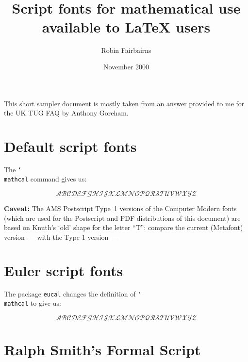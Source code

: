 \documentclass[a4paper]{article}
\DeclareRobustCommand\cs[1]{\texttt{\char`\\#1}}
\begin{document}
\title{Script fonts for mathematical use\\ available to \LaTeX{} users}
\author{Robin Fairbairns}
\date{November 2000}
\maketitle

This short sampler document is mostly taken from an answer provided to
me for the UK TUG FAQ by Anthony Goreham.

\section{Default script fonts}

The \cs{mathcal} command gives us:

$$\mathcal{ABCDEFGHIJKLMNOPQRSTUVWXYZ}$$

\newlength\depthT
\settoheight{}

\noindent\textbf{Caveat:} The AMS Postscript Type~1 versions of the Computer
Modern fonts (which are used for the Postscript and PDF distributions
of this document) are based on Knuth's `old' shape for the letter
``T'': compare the current (Meta\-font) version~---
 with the Type
1 version~--- 

\section{Euler script fonts}

The package \texttt{eucal} changes the definition of \cs{mathcal} to
give us:

\renewcommand\DeclareMathAlphabet[5]{\ignorespaces}
\renewcommand\SetMathAlphabet[6]{\ignorespaces}
\usepackage{eucal}

$$\mathcal{ABCDEFGHIJKLMNOPQRSTUVWXYZ}$$

\section{Ralph Smith's Formal Script}
\end{document}
